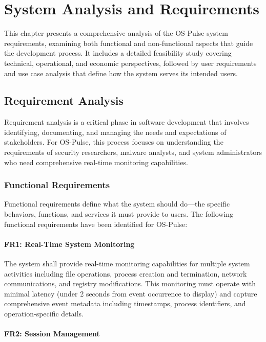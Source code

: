 \chapter{System Analysis and Requirements}

This chapter presents a comprehensive analysis of the OS-Pulse system requirements, examining both functional and non-functional aspects that guide the development process. It includes a detailed feasibility study covering technical, operational, and economic perspectives, followed by user requirements and use case analysis that define how the system serves its intended users.

\section{Requirement Analysis}

Requirement analysis is a critical phase in software development that involves identifying, documenting, and managing the needs and expectations of stakeholders. For OS-Pulse, this process focuses on understanding the requirements of security researchers, malware analysts, and system administrators who need comprehensive real-time monitoring capabilities.

\subsection{Functional Requirements}

Functional requirements define what the system should do—the specific behaviors, functions, and services it must provide to users. The following functional requirements have been identified for OS-Pulse:

\subsubsection{FR1: Real-Time System Monitoring}

The system shall provide real-time monitoring capabilities for multiple system activities including file operations, process creation and termination, network communications, and registry modifications. This monitoring must operate with minimal latency (under 2 seconds from event occurrence to display) and capture comprehensive event metadata including timestamps, process identifiers, and operation-specific details.

\subsubsection{FR2: Session Management}

